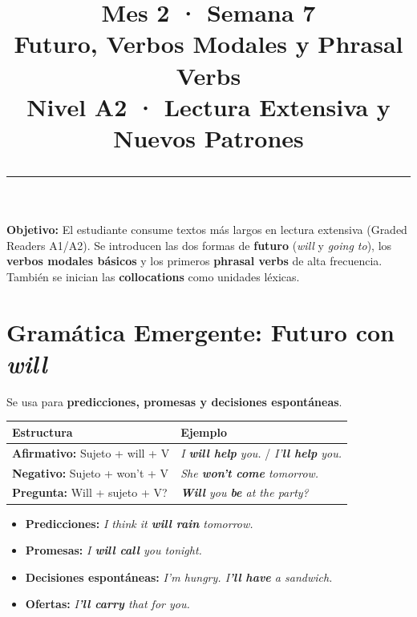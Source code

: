 \documentclass[12pt,a4paper]{article}
\title{%
  \vspace{-1cm}
  {\Huge\bfseries\textcolor{mes2}{Mes 2 · Semana 7}}\\[0.3cm]
  {\Large Futuro, Verbos Modales y Phrasal Verbs}\\[0.2cm]
  {\large\color{grissuave} Nivel A2 · Lectura Extensiva y Nuevos Patrones}\\[0.5cm]
  \rule{\textwidth}{1.5pt}
}
\author{}
\date{}
\begin{document}
\maketitle
\thispagestyle{empty}

\begin{cajanivel}
\textbf{Objetivo:} El estudiante consume textos más largos en lectura extensiva (Graded Readers A1/A2). Se introducen las dos formas de \textbf{futuro} (\textit{will} y \textit{going to}), los \textbf{verbos modales básicos} y los primeros \textbf{phrasal verbs} de alta frecuencia. También se inician las \textbf{collocations} como unidades léxicas.
\end{cajanivel}

\section{Gramática Emergente: Futuro con \textit{will}}

\begin{cajagrammar}
Se usa para \textbf{predicciones, promesas y decisiones espontáneas}.

\medskip
\begin{tabularx}{\textwidth}{@{} l X @{}}
\toprule
\textbf{Estructura} & \textbf{Ejemplo} \\
\midrule
\textbf{Afirmativo:} Sujeto + will + V & \textit{I \textbf{will help} you.} / \textit{I'\textbf{ll help} you.} \\
\textbf{Negativo:} Sujeto + won't + V & \textit{She \textbf{won't come} tomorrow.} \\
\textbf{Pregunta:} Will + sujeto + V? & \textit{\textbf{Will} you \textbf{be} at the party?} \\
\bottomrule
\end{tabularx}

\medskip
\begin{cajaejemplo}
\begin{itemize}[nosep, leftmargin=0.8cm]
  \item \textbf{Predicciones:} \textit{I think it \textbf{will rain} tomorrow.}
  \item \textbf{Promesas:} \textit{I \textbf{will call} you tonight.}
  \item \textbf{Decisiones espontáneas:} \textit{I'm hungry. I\textbf{'ll have} a sandwich.}
  \item \textbf{Ofertas:} \textit{I\textbf{'ll carry} that for you.}
\end{itemize}
\end{cajaejemplo}
\end{cajagrammar}
\end{document}
